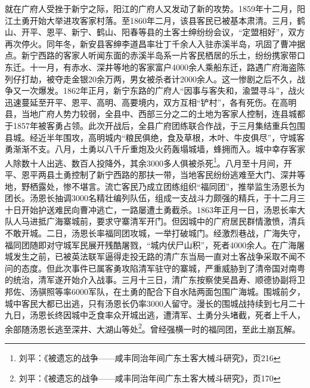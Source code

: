 就在广府人受挫于新宁之际，阳江的广府人又发动了新的攻势。1859年十二月，阳江土勇开始大举进攻客家村落。至1860年二月，该县客民已被基本肃清。三月，鹤山、开平、恩平、新宁、鹤山、阳春等县的土客士绅纷纷会议，“定盟相好”，双方再次停火。同年冬，新安县客绅李道昌率壮丁千余人入驻赤溪半岛，巩固了曹冲据点。新宁西路的客家人听闻东面的赤溪半岛系一片客民栖居的乐土，纷纷携家带口东迁。十一月，有赤水、深井等地的客家富户4000余人乘船东迁，路遇广府海盗陈列仔打劫，被夺走金银20余万两，男女被杀者计2000余人。这一惨剧之后不久，战争又一次爆发。1862年正月，新宁东路的广府人“因事与客失和，渝盟寻斗”，战火迅速蔓延至开平、恩平、高明、高要境内，双方互相“铲村”，各有死伤。在高明县，当地广府人势力较弱，全县中、西部三分之二的土地为客家人控制，连县城都于1857年被客勇占领。此次开战后，全县广府团练联合作战，于三月集结重兵包围县城。经近半年围攻，高明城内“粮民俱绝，食及草根，木叶、牛皮俱尽”，守城客勇渐渐不支。八月，土勇以八千斤重炮及火药轰塌城墙，蜂拥而入。城中幸存客家人除数十人出逃、数百人投降外，其余3000多人俱被杀死\footnote{刘平：《被遗忘的战争——咸丰同治年间广东土客大械斗研究》，页216}。八月至十月间，开平、恩平两县土勇控制了新宁西路的那扶一带，当地客民纷纷逃难至大门、深井等地，野栖露处，惨不堪言。流亡客民乃成立团练组织“福同团”，推举监生汤恩长为团长。汤恩长抽调3000名精壮编列队伍，组成一支战斗力颇强的精兵，于十二月三十日开始护送难民向曹冲逃亡，一路屡遭土勇截杀。1863年正月一日，汤恩长率大队人马进抵广海寨城前，要求守寨清军开门。但因城中的广府居民群情激愤，清兵不敢开城。二日，汤恩长率福同团攻城，一举打破城门。经激烈巷战，广海失守，福同团随即对守城军民展开残酷屠戮，“城内伏尸山积”，死者4000余人。在广海屠城发生之前，已被英法联军逼得走投无路的清广东当局一直对土客战争采取不闻不问的态度。但此次事件已属客勇攻陷清军驻守的寨城，严重威胁到了清帝国对南粤的统治，清军遂开始介入战事。三月十三日，清广东按察使吴昌寿、顺德协副将卫邦佐、汤骐照等率6000军队，在土勇的配合下自水陆两面包围广海城。围城前夕，城中客民大都已出逃，只有汤恩长仍率3000人留守。漫长的围城战持续到七月二十九日，汤恩长终因城中乏食率众开城出逃，遭清军、土勇分头堵截，死者上千人，余部随汤恩长逃至深井、大湖山等处\footnote{刘平：《被遗忘的战争——咸丰同治年间广东土客大械斗研究》，页170}。曾经强横一时的福同团，至此土崩瓦解。

